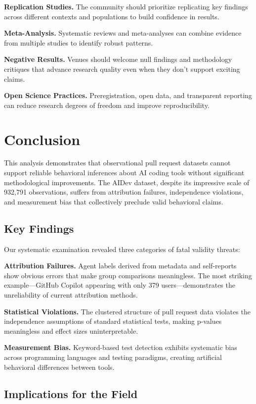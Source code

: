 \documentclass[conference]{IEEEtran}
\begin{document}
\textbf{Replication Studies.} The community should prioritize replicating key findings across different contexts and populations to build confidence in results.

\textbf{Meta-Analysis.} Systematic reviews and meta-analyses can combine evidence from multiple studies to identify robust patterns.

\textbf{Negative Results.} Venues should welcome null findings and methodology critiques that advance research quality even when they don't support exciting claims.

\textbf{Open Science Practices.} Preregistration, open data, and transparent reporting can reduce research degrees of freedom and improve reproducibility.

\section{Conclusion}

This analysis demonstrates that observational pull request datasets cannot support reliable behavioral inferences about AI coding tools without significant methodological improvements. The AIDev dataset, despite its impressive scale of 932,791 observations, suffers from attribution failures, independence violations, and measurement bias that collectively preclude valid behavioral claims.

\subsection{Key Findings}

Our systematic examination revealed three categories of fatal validity threats:

\textbf{Attribution Failures.} Agent labels derived from metadata and self-reports show obvious errors that make group comparisons meaningless. The most striking example—GitHub Copilot appearing with only 379 users—demonstrates the unreliability of current attribution methods.

\textbf{Statistical Violations.} The clustered structure of pull request data violates the independence assumptions of standard statistical tests, making p-values meaningless and effect sizes uninterpretable.

\textbf{Measurement Bias.} Keyword-based test detection exhibits systematic bias across programming languages and testing paradigms, creating artificial behavioral differences between tools.

\subsection{Implications for the Field}
\end{document}
